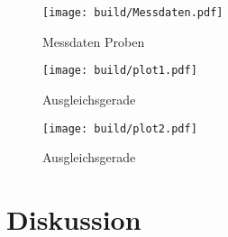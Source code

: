 \begin{figure}[H]
	\centering
	\texttt{[image: build/Messdaten.pdf]}
	\caption{Messdaten Proben}\label{fig:Aufbau}
\end{figure}

\begin{figure}[H]
	\centering
	\texttt{[image: build/plot1.pdf]}
	\caption{Ausgleichsgerade}\label{fig:Aufbau}
\end{figure}

\begin{figure}[H]
	\centering
	\texttt{[image: build/plot2.pdf]}
	\caption{Ausgleichsgerade}\label{fig:Aufbau}
\end{figure}


\section{Diskussion}


\newpage
\printbibliography

